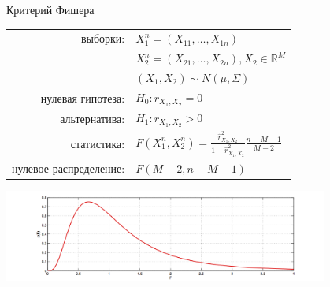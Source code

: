\documentclass[9pt,pdf,utf8,hyperref={unicode},aspectratio=169]{beamer}
\begin{document}
\begin{frame}{Критерий Фишера}
	\begin{center}
		\begin{tabular}{rl}
			выборки:                        & $X_1^n=\left(X_{11},\ldots,X_{1n}\right)$\\
		  	                                & $X_2^n=\left(X_{21},\ldots,X_{2n}\right), X_{2} \in \mathbb{R}^M$\\
			                                & $\left(X_{1},X_{2}\right)\sim N\left(\mu,\Sigma\right)$ \\
			нулевая гипотеза:               & $H_0\colon r_{X_1,X_2}=0$ \\
			альтернатива:                   & $H_1\colon r_{X_1,X_2}>0$ \\
			статистика:                     & $F\left(X_1^n, X_2^n\right) = \frac{\hat{r}_{X_1,X_2}^2}{1-\hat{r}_{X_1,X_2}^2}\frac{n-M-1}{M-2}$ \\
			нулевое распределение:          & $F(M-2, n-M-1)$\\
		\end{tabular}
		\includegraphics[width=0.8\textwidth]{fish.png}
	\end{center}
\end{frame}
\end{document}
